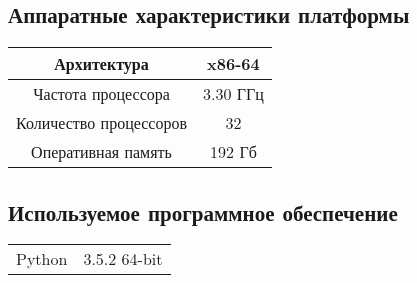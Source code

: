 
\appendix
{}
\renewcommand{\thesection}{\Asbuk{section}}

\intro{}\label{appendix:specs}

\singlespace


\subsection{ Аппаратные характеристики платформы }

\begin{tabular}{c|c}
	Архитектура            & x86-64   \\ \hline
	Частота процессора     & 3.30 ГГц \\ \hline
	Количество процессоров & 32       \\ \hline
	Оперативная память     & 192 Гб \\ 
\end {tabular}

\subsection{ Используемое программное обеспечение }

\begin{tabular}{c|c}
	Python            &  3.5.2 64-bit  \\
\end {tabular}